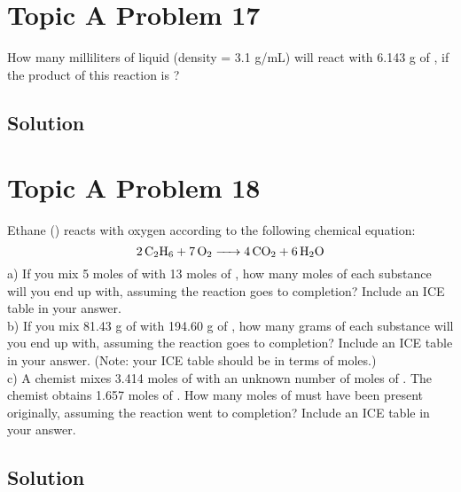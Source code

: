 \documentclass[10pt]{article}
\begin{document}
    \pagebreak
    \section{Topic A Problem 17}
        How many milliliters of liquid  (density = 3.1 g/mL) will react with 6.143 g of , if the product of this reaction is ?

        \subsection{Solution}

    \pagebreak
    \section{Topic A Problem 18}
        Ethane () reacts with oxygen according to the following chemical equation:
        \begin{equation}
            \ce{2 C2H6 + 7 O2 -> 4 CO2 + 6 H2O}
        \end{equation}
        a) If you mix 5 moles of  with 13 moles of , how many moles of each substance will you end up with, assuming the reaction goes to completion? 
        Include an ICE table in your answer.\\
        b) If you mix 81.43 g of  with 194.60 g of , how many grams of each substance will you end up with, assuming the reaction goes to completion? 
        Include an ICE table in your answer. 
        (Note: your ICE table should be in terms of moles.)\\
        c) A chemist mixes 3.414 moles of  with an unknown number of moles of . 
        The chemist obtains 1.657 moles of . 
        How many moles of  must have been present originally, assuming the reaction went to completion? 
        Include an ICE table in your answer.

        \subsection{Solution}

    \pagebreak
\end{document}
